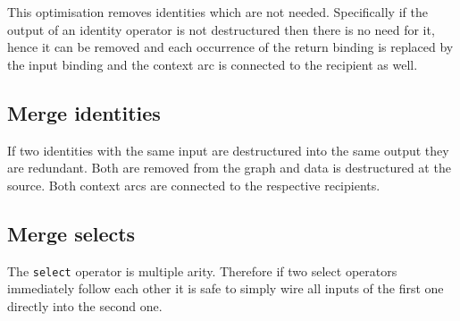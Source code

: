 This optimisation removes identities which are not needed.
Specifically if the output of an identity operator is not destructured then there is no need for it, hence it can be removed and each occurrence of the return binding is replaced by the input binding and the context arc is connected to the recipient as well.

\subsection{Merge identities}

If two identities with the same input are destructured into the same output they are redundant.
Both are removed from the graph and data is destructured at the source.
Both context arcs are connected to the respective recipients.

\subsection{Merge selects}

The \texttt{select} operator is multiple arity.
Therefore if two select operators immediately follow each other it is safe to simply wire all inputs of the first one directly into the second one.
